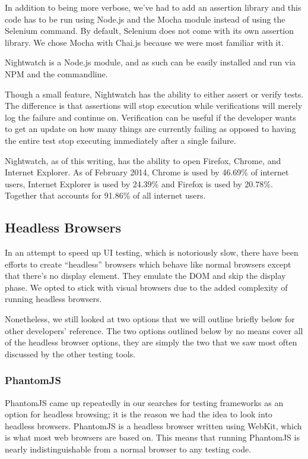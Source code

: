 \documentclass[12pt]{ucthesis}
\begin{document}
In addition to being more verbose, we've had to add an assertion library and this code has to be run using Node.js and the Mocha module instead of using the Selenium command. By default, Selenium does not come with its own assertion library. We chose Mocha with Chai.js because we were most familiar with it.

Nightwatch is a Node.js module, and as such can be easily installed and run via NPM and the commandline.

Though a small feature, Nightwatch has the ability to either assert or verify tests. The difference is that assertions will stop execution while verifications will merely log the failure and continue on. Verification can be useful if the developer wants to get an update on how many things are currently failing as opposed to having the entire test stop executing immediately after a single failure.

Nightwatch, as of this writing, has the ability to open Firefox, Chrome, and Internet Explorer. As of February 2014, Chrome is used by 46.69\% of internet users, Internet Explorer is used by 24.39\% and Firefox is used by 20.78\%\cite{BrowserStats}. Together that accounts for 91.86\% of all internet users.

\subsection{Headless Browsers}
In an attempt to speed up UI testing, which is notoriously slow, there have been efforts to create ``headless'' browsers which behave like normal browsers except that there's no display element. They emulate the DOM and skip the display phase. We opted to stick with visual browsers due to the added complexity of running headless browsers.

Nonetheless, we still looked at two options that we will outline briefly below for other developers' reference. The two options outlined below by no means cover all of the headless browser options, they are simply the two that we saw most often discussed by the other testing tools.

\subsubsection{PhantomJS}
PhantomJS \cite{PhantomJS} came up repeatedly in our searches for testing frameworks as an option for headless browsing; it is the reason we had the idea to look into headless browsers. PhantomJS is a headless browser written using WebKit, which is what most web browsers are based on. This means that running PhantomJS is nearly indistinguishable from a normal browser to any testing code.
\end{document}
